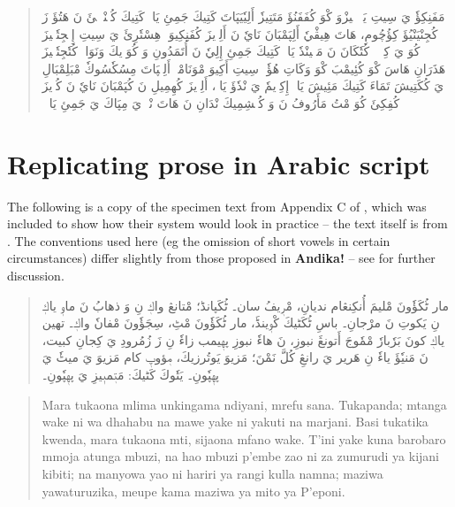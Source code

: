 \begin{quotation}
\begin{Arabic}
مَفَنِكِؤٗ يَ سِيتِ يَمٖئٖلٖيزْوَ كْوَ كُفَفَنُؤَ مَتَتِيزٗ أَلِيٗيَپَاتَ كَتِيكَ جَمِئِ يَاكٖ كَتِيكَ كُئٖنْدٖلٖئَ نَ هَتُؤَ زَ كُجِنْيَنْيُؤَ كِؤُچُومِ، هَاتَ هِيڤْيٗ أَلِپَمْبَانَ نَايٗ نَ أَلِوٖيزَ كُفَنِكِيوَ۔ هِسْتٗرِئَ يَ سِيتِ إِمٖجِتٗكٖيزَ كُوَ يَ كِپٖكٖئٖ كُتٗكَانَ نَ مَتٖينْدٗ يَاكٖ كَتِيكَ جَمِئِ إِلِيٗ نَ أُتَمَدُونِ وَ كُوَوٖيكَ وَنَوَاكٖ كُتٗجِتٗكٖيزَ هَذَرَانِ هَاسَ كْوَ كُئِيمْبَ كْوَ وَكَاتِ هُؤٗ۔ سِيتِ أَكِيوَ مْوَنَامْكٖ أَلِيٖپَاتَ مِسُكٗسُوكٗ مْبَلِمْبَالِ يَ كُكَتِيشَ تَمَاءَ كَتِيكَ مَئِيشَ يَاكٖ إِكِوٖيمٗ يَ نْدٗؤَ يَاكٖ، أَلِوٖيزَ كُهِمِيلِ نَ كُپَمْبَانَ نَايٗ نَ كُوٖيزَ كُفِكِئَ كُوَ مْتُ مَأَرُوفُ نَ وَ كُهٖشِمِيكَ نْدَانِ نَ هَاتَ نْجٖ يَ مِپَاكَ يَ جَمِئِ يَاكٖ۔
\end{Arabic}
\end{quotation}


\section{Replicating prose in Arabic script}

The following is a copy of the specimen text from Appendix C of \citet{Omar1997}, which was included to show how their system would look in practice -- the text itself is from \citet{Omar1998}.  The conventions used here (eg the omission of short vowels in certain circumstances) differ slightly from those proposed in \textbf{Andika!} -- see  for further discussion.

\begin{quotation}
\begin{Arabic}
مار ٹُكَؤٗونَ مْليمَ أُنكِنڠام نديانِ، مْرٖيفُ سان۔  ٹُكَپانڈ؛ مْتانڠ واكٖ نِ وَ ذهابُ نَ ماوٖ ياكٖ نِ يَكوتِ نَ مرْجانِ۔  باسِ ٹُكَٹيكَ كْوٖينڈَ، مار ٹُكَؤٗونَ مْٹِ، سِجَؤٗونَ مْفانٗ واكٖ۔  تهين ياكٖ كونَ بَرٗبارٗ مْمٗوجَ أَتونڠَ نبوزِ، نَ هاءٗ نبوزِ پهٖيمب زاءٗ نِ زَ زُمُرودِ يَ كِجانِ كبيت، نَ مَنيٗؤَ ياءٗ نِ هَرير يَ رانڠِ كُلَّ نَمْنَ؛ مَزيوَ يَوتُرزيكَ، مٖؤوپٖ كام مَزيوَ يَ ميٹٗ يَ پهٖپٗونِ۔
 يَتٗوكَ كَٹيكَ: مَتٖمبٖيزِ يَ پهٖپٗونِ۔
\end{Arabic}
\end{quotation}

\begin{quotation}
Mara tukaona mlima unkingama ndiyani, mrefu sana.  Tukapanda; mtanga wake ni wa dhahabu na mawe yake ni yakuti na marjani.  Basi tukatika kwenda, mara tukaona mti, sijaona mfano wake.  T'ini yake kuna barobaro mmoja atunga mbuzi, na hao mbuzi p'embe zao ni za zumurudi ya kijani kibiti; na manyowa yao ni hariri ya rangi kulla namna; maziwa yawaturuzika, meupe kama maziwa ya mito ya P'eponi.
\end{quotation}

